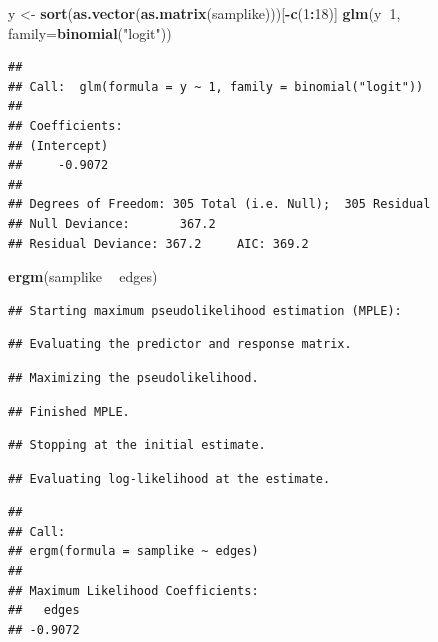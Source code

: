 \documentclass[]{book}
\newenvironment{Shaded}{\begin{snugshade}}{\end{snugshade}}
\newcommand{\DataTypeTok}[1]{\textcolor[rgb]{0.13,0.29,0.53}{#1}}
\newcommand{\DecValTok}[1]{\textcolor[rgb]{0.00,0.00,0.81}{#1}}
\newcommand{\KeywordTok}[1]{\textcolor[rgb]{0.13,0.29,0.53}{\textbf{#1}}}
\newcommand{\NormalTok}[1]{#1}
\newcommand{\OperatorTok}[1]{\textcolor[rgb]{0.81,0.36,0.00}{\textbf{#1}}}
\newcommand{\StringTok}[1]{\textcolor[rgb]{0.31,0.60,0.02}{#1}}
\begin{document}
\begin{Shaded}
\begin{Highlighting}[]
\NormalTok{y <-}\StringTok{ }\KeywordTok{sort}\NormalTok{(}\KeywordTok{as.vector}\NormalTok{(}\KeywordTok{as.matrix}\NormalTok{(samplike)))[}\OperatorTok{-}\KeywordTok{c}\NormalTok{(}\DecValTok{1}\OperatorTok{:}\DecValTok{18}\NormalTok{)]}
\KeywordTok{glm}\NormalTok{(y}\OperatorTok{~}\DecValTok{1}\NormalTok{, }\DataTypeTok{family=}\KeywordTok{binomial}\NormalTok{(}\StringTok{"logit"}\NormalTok{))}
\end{Highlighting}
\end{Shaded}

\begin{verbatim}
## 
## Call:  glm(formula = y ~ 1, family = binomial("logit"))
## 
## Coefficients:
## (Intercept)  
##     -0.9072  
## 
## Degrees of Freedom: 305 Total (i.e. Null);  305 Residual
## Null Deviance:       367.2 
## Residual Deviance: 367.2     AIC: 369.2
\end{verbatim}

\begin{Shaded}
\begin{Highlighting}[]
\KeywordTok{ergm}\NormalTok{(samplike }\OperatorTok{~}\StringTok{ }\NormalTok{edges)}
\end{Highlighting}
\end{Shaded}

\begin{verbatim}
## Starting maximum pseudolikelihood estimation (MPLE):
\end{verbatim}

\begin{verbatim}
## Evaluating the predictor and response matrix.
\end{verbatim}

\begin{verbatim}
## Maximizing the pseudolikelihood.
\end{verbatim}

\begin{verbatim}
## Finished MPLE.
\end{verbatim}

\begin{verbatim}
## Stopping at the initial estimate.
\end{verbatim}

\begin{verbatim}
## Evaluating log-likelihood at the estimate.
\end{verbatim}

\begin{verbatim}
## 
## Call:
## ergm(formula = samplike ~ edges)
## 
## Maximum Likelihood Coefficients:
##   edges  
## -0.9072
\end{verbatim}
\end{document}
